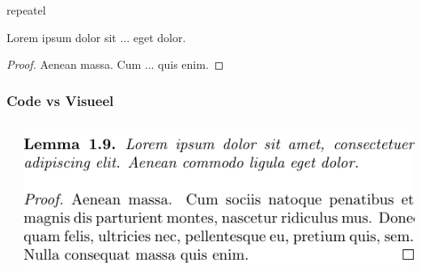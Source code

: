 \documentclass[../presentatie.tex]{subfiles}
\begin{document}

\begin{saveblock}{repeatel}
    \begin{highlightblock}[linewidth=0.5\textwidth,gobble=12]
        \begin{lemma}
            Lorem ipsum dolor sit
            ... eget dolor.

            \begin{proof}
                Aenean massa. Cum
                ... quis enim.
            \end{proof}
        \end{lemma}
    \end{highlightblock}
\end{saveblock}

\begin{frame}
    \frametitle{Code vs Visueel}
    \begin{columns}
        \begin{column}{0.5\textwidth}
        \end{column}
        \begin{column}{0.5\textwidth}
            \includegraphics[width=\linewidth,height=0.8\textheight,keepaspectratio]{assets/latexRepeatEl.pdf}
        \end{column}
    \end{columns}
\end{frame}
\end{document}
